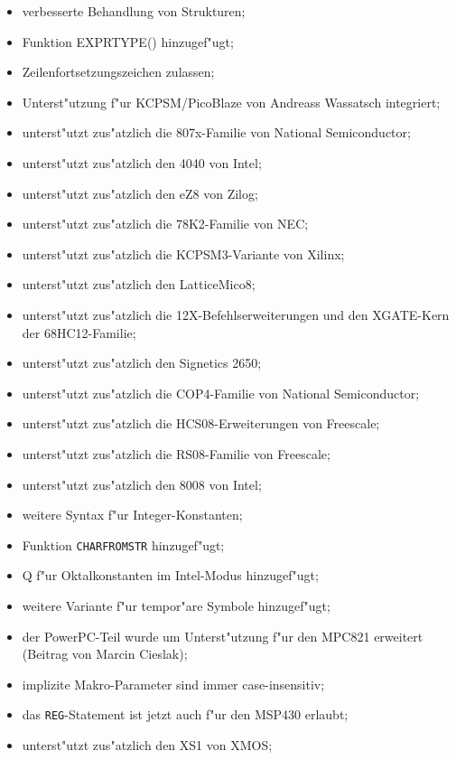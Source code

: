 \documentclass[12pt,a4paper,twoside]{report}
\newcommand{\tty}[1]{{\tt #1}}
\begin{document}
\begin{itemize}
{\begin{itemize}
      \item{verbesserte Behandlung von Strukturen;}
      \item{Funktion EXPRTYPE() hinzugef"ugt;}
      \item{Zeilenfortsetzungszeichen zulassen;}
      \item{Unterst"utzung f"ur KCPSM/PicoBlaze von Andreass Wassatsch
            integriert;}
      \item{unterst"utzt zus"atzlich die 807x-Familie von National
            Semiconductor;}
      \item{unterst"utzt zus"atzlich den 4040 von Intel;}
      \item{unterst"utzt zus"atzlich den eZ8 von Zilog;}
      \item{unterst"utzt zus"atzlich die 78K2-Familie von NEC;}
      \item{unterst"utzt zus"atzlich die KCPSM3-Variante von Xilinx;}
      \item{unterst"utzt zus"atzlich den LatticeMico8;}
      \item{unterst"utzt zus"atzlich die 12X-Befehlserweiterungen
            und den XGATE-Kern der 68HC12-Familie;}
      \item{unterst"utzt zus"atzlich den Signetics 2650;}
      \item{unterst"utzt zus"atzlich die COP4-Familie von National
            Semiconductor;}
      \item{unterst"utzt zus"atzlich die HCS08-Erweiterungen von Freescale;}
      \item{unterst"utzt zus"atzlich die RS08-Familie von Freescale;}
      \item{unterst"utzt zus"atzlich den 8008 von Intel;}
      \item{weitere Syntax f"ur Integer-Konstanten;}
      \item{Funktion \tty{CHARFROMSTR} hinzugef"ugt;}
      \item{Q f"ur Oktalkonstanten im Intel-Modus hinzugef"ugt;}
      \item{weitere Variante f"ur tempor"are Symbole hinzugef"ugt;}
      \item{der PowerPC-Teil wurde um Unterst"utzung f"ur den MPC821 erweitert
            (Beitrag von Marcin Cieslak);}
      \item{implizite Makro-Parameter sind immer case-insensitiv;}
      \item{das \tty{REG}-Statement ist jetzt auch f"ur den MSP430
            erlaubt;}
      \item{unterst"utzt zus"atzlich den XS1 von XMOS;}

\end{itemize}}
\end{itemize}
\end{document}
